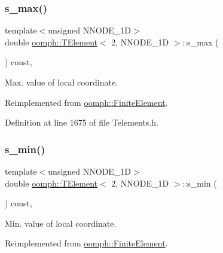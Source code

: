 \subsubsection{\texorpdfstring{s\+\_\+max()}{s\_max()}}
{\footnotesize\ttfamily template$<$unsigned N\+N\+O\+D\+E\+\_\+1D$>$ \\
double \hyperlink{classoomph_1_1TElement}{oomph\+::\+T\+Element}$<$ 2, N\+N\+O\+D\+E\+\_\+1D $>$\+::s\+\_\+max (\begin{DoxyParamCaption}{ }\end{DoxyParamCaption}) const\hspace{0.3cm}{\ttfamily [inline]}, {\ttfamily [virtual]}}



Max. value of local coordinate. 



Reimplemented from \hyperlink{classoomph_1_1FiniteElement_a64adbe9356927133686ab53f00341ea8}{oomph\+::\+Finite\+Element}.



Definition at line 1675 of file Telements.\+h.

\mbox{\label{classoomph_1_1TElement_3_012_00_01NNODE__1D_01_4_a16749c4131f12c3723eb28a201370768}} 
\subsubsection{\texorpdfstring{s\+\_\+min()}{s\_min()}}
{\footnotesize\ttfamily template$<$unsigned N\+N\+O\+D\+E\+\_\+1D$>$ \\
double \hyperlink{classoomph_1_1TElement}{oomph\+::\+T\+Element}$<$ 2, N\+N\+O\+D\+E\+\_\+1D $>$\+::s\+\_\+min (\begin{DoxyParamCaption}{ }\end{DoxyParamCaption}) const\hspace{0.3cm}{\ttfamily [inline]}, {\ttfamily [virtual]}}



Min. value of local coordinate. 



Reimplemented from \hyperlink{classoomph_1_1FiniteElement_a35f0803115b68bd162c07de04eeb6c5c}{oomph\+::\+Finite\+Element}.



